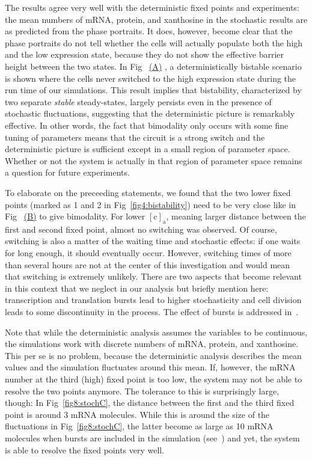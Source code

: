 \documentclass[10pt,letterpaper]{article}
\newcommand{\n}[1]{\mathrm{#1}}
\newcommand\subref[2]{%
	\def\myref{\getrefnumber{#1}}%
	\hyperref[#1]{\myref\mbox{#2}}%
}
\begin{document}
	The results agree very well with the deterministic fixed points and
	experiments: the mean numbers of mRNA, protein, and xanthosine in the
	stochastic results are as predicted from the phase portraits. It does,
	however, become clear that the phase portraits do not tell whether the cells
	will actually populate both the high and the low expression state,
	because they do not show the effective barrier height between the two states.
	In Fig~\subref{fig8:stochC}{(A)}, a deterministically bistable scenario is shown where the cells never switched to the high
	expression state during the run time of our simulations. This result
	implies that bistability, characterized by two separate
	\emph{stable} steady-states, largely persists even in the presence
	of stochastic fluctuations, suggesting that the deterministic
	picture is remarkably effective. In other words,
	the fact that bimodality only occurs with some fine tuning of
	parameters means that the circuit is a strong switch and the
	deterministic picture is sufficient except in a small region of
	parameter space. Whether or not the system is actually in that
	region of parameter space remains a question for future experiments.

	To elaborate on the preceeding statements,
	we found that the two lower fixed points (marked as 1 and 2 in
	Fig~\ref{fig4:bistability}) need to be very close like in
	Fig~\subref{fig8:stochC}{(B)} to give bimodality. For lower $\n{[c]_a}$,
	meaning larger distance between the first and second fixed point,
	almost no switching was observed. Of course, switching is also a matter of the
	waiting time and stochastic effects: if one waits for long enough, it
	should eventually occur. However, switching times of more than several hours
	are not at the center of this investigation and would mean that switching is
	extremely unlikely. There are two aspects that become relevant in this
	context that we neglect in our analysis but briefly mention here:
	transcription and translation bursts lead to higher stochasticity and cell
	division leads to some discontinuity in the process. The effect of bursts is addressed in~.
	
	Note that while the deterministic analysis assumes the variables to be
	continuous, the simulations work with discrete numbers of mRNA, protein, and
	xanthosine. This per se is no problem, because the deterministic analysis
	describes the mean values and the simulation fluctuates around this mean.
	If, however, the mRNA number at the third (high) fixed point is too low, the
	system may not be able to resolve the two points anymore. The tolerance to this is surprisingly large, though: In Fig~\ref{fig8:stochC}, the distance between the first and the third fixed point is around 3 mRNA molecules. While this is around the size of the fluctuations in Fig~\ref{fig8:stochC}, the latter become as large as 10 mRNA molecules when bursts are included in the simulation (see~) and yet, the system is able to resolve the fixed points very well.
	
\end{document}
